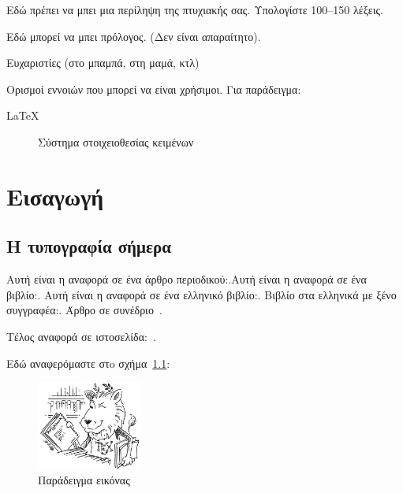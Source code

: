 \documentclass[oneside, 12pt]{book}
\begin{document}
	\Titlepage
	\Declarationpage
	\begin{Abstract}
		Εδώ πρέπει να μπει μια περίληψη της πτυχιακής σας. Υπολογίστε 100--150 λέξεις.
	\end{Abstract}
	\tableofcontents
	
	\listoftables
	\listoffigures
	
	\begin{Preface}
		Εδώ μπορεί να μπει πρόλογος. (Δεν είναι απαραίτητο).
	\end{Preface}
	
	\begin{Acknowledgement}
		Ευχαριστίες (στο μπαμπά, στη μαμά, κτλ)
	\end{Acknowledgement}
	
	\begin{Definitions}
		Ορισμοί εννοιών που μπορεί να είναι χρήσιμοι. Για παράδειγμα:
		
		\begin{description}
			\item [\LaTeX] Σύστημα στοιχειοθεσίας κειμένων
		\end{description}
		
	\end{Definitions}
	
	\chapter{Εισαγωγή}
	\leftmark\rightmark
	\section{Η τυπογραφία σήμερα}
	Αυτή είναι η αναφορά σε ένα άρθρο περιοδικού:\citep{Schmidt98}.Αυτή
	είναι η αναφορά σε ένα βιβλίο:\citep{goosens93}. Αυτή είναι η αναφορά
	σε ένα ελληνικό βιβλίο:\citep{Chatzigeorgiou05}. Βιβλίο στα ελληνικά
	με ξένο συγγραφέα:\citep{Sommerville09}. Άρθρο σε
	συνέδριο~\citep{4343930}. 
	
	Τέλος αναφορά σε ιστοσελίδα:~\citep{Wikipedia_BibTeX}.
	
	Εδώ αναφερόμαστε στo σχήμα~\ref{fig:image1}:
	\begin{figure}[h]
		\centering
		\includegraphics[width=35mm]{lion.png}
		\caption{Παράδειγμα εικόνας}
		\label{fig:image1}
	\end{figure}
	
\end{document}
